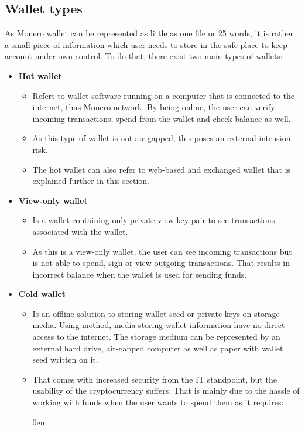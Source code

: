 \documentclass[
  printed, %
  table,   %
  nolof,     %
  nolot,     %
           oneside, color
]{fithesis3}
\begin{document}
\subsection{Wallet types}
As Monero wallet can be represented as little as one file or 25 words, it is rather a small piece of information which user needs to store in the safe place to keep account under own control. To do that, there exist two main types of wallets:
\begin{itemize}\itemsep0em
\item \textbf{Hot wallet}
\begin{itemize}\itemsep0em
\item Refers to wallet software running on a computer that is connected to the internet, thus Monero network. By being online, the user can verify incoming transactions, spend from the wallet and check balance as well.
\item As this type of wallet is not air-gapped, this poses an external intrusion risk.
\item The hot wallet can also refer to web-based and exchanged wallet that is explained further in this section.
\end{itemize}
\item \textbf{View-only wallet}
\begin{itemize}\itemsep0em
\item Is a wallet containing only private view key pair to see transactions associated with the wallet.
\item As this is a view-only wallet, the user can see incoming transactions but is not able to spend, sign or view outgoing transactions. That results in incorrect balance when the wallet is used for sending funds.
\end{itemize}
\item \textbf{Cold wallet}
\begin{itemize}\itemsep0em
\item Is an offline solution to storing wallet seed or private keys on storage media. Using method, media storing wallet information have no direct access to the internet. The storage medium can be represented by an external hard drive, air-gapped computer as well as paper with wallet seed written on it.
\item That comes with increased security from the IT standpoint, but the usability of the cryptocurrency suffers. That is mainly due to the hassle of working with funds when the user wants to spend them as it requires:
\begin{itemize}\itemsep0em

\end{itemize}
\end{itemize}
\end{itemize}
\end{document}
